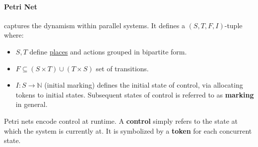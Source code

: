 \documentclass[99-notes-packed.tex]{subfiles}
\begin{document}
\paragraph*{Petri Net} captures the dynamism within parallel systems. It defines a $(S, T, F, I)$-tuple where: 
\begin{itemize}
    \item $S, T$ define \underline{places} and actions grouped in bipartite form. 
    \item $F \subseteq (S \times T) \cup (T \times S)$ set of transitions.
    \item $I: S \rightarrow \mathbb{N}$ (initial marking) defines the initial state of control, via allocating tokens to initial states. Subsequent states of control is referred to as \textbf{marking} in general.
\end{itemize}

\begin{definition}
    Petri nets encode control at runtime. A \textbf{control} simply refers to the state at which the system is currently at. It is symbolized by a \textbf{token} for each concurrent state. 
\end{definition}
\end{document}
